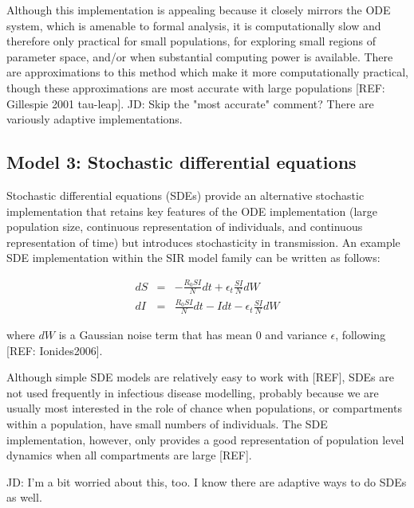 \documentclass[margin,line,11pt]{article}
\begin{document}
\noindent Although this implementation is appealing because it closely mirrors the ODE system, which is amenable to formal analysis, it is computationally slow and therefore only practical for small populations, for exploring small regions of parameter space, and/or when substantial computing power is available. There are approximations to this method which make it more computationally practical, though these approximations are most accurate with large populations [REF: Gillespie 2001 tau-leap].
JD: Skip the "most accurate" comment? There are variously adaptive implementations.

\subsection{Model 3: Stochastic differential equations}

Stochastic differential equations (SDEs) provide an alternative stochastic implementation that retains key features of the ODE implementation (large population size, continuous representation of individuals, and continuous representation of time) but introduces stochasticity in transmission. An example SDE implementation within the SIR model family can be written as follows: 

\begin{eqnarray*}
{dS} &=& -\frac{R_0 S I}{N} dt +\epsilon_t\frac{S I}{N}dW \\
{dI} &=& \frac{R_0 S I}{N} dt - I dt - \epsilon_t\frac{S I}{N}dW
\end{eqnarray*}

\noindent where $dW$ is a Gaussian noise term that has mean 0 and variance $\epsilon$, following [REF: Ionides2006]. %

Although simple SDE models are relatively easy to work with [REF], SDEs are not used frequently in infectious disease modelling, probably because we are usually most interested in the role of chance when populations, or compartments within a population, have small numbers of individuals. 
The SDE implementation, however, only provides a good representation of population level dynamics when all compartments are large [REF]. %

JD: I'm a bit worried about this, too. I know there are adaptive ways to do SDEs as well. 
\end{document}
